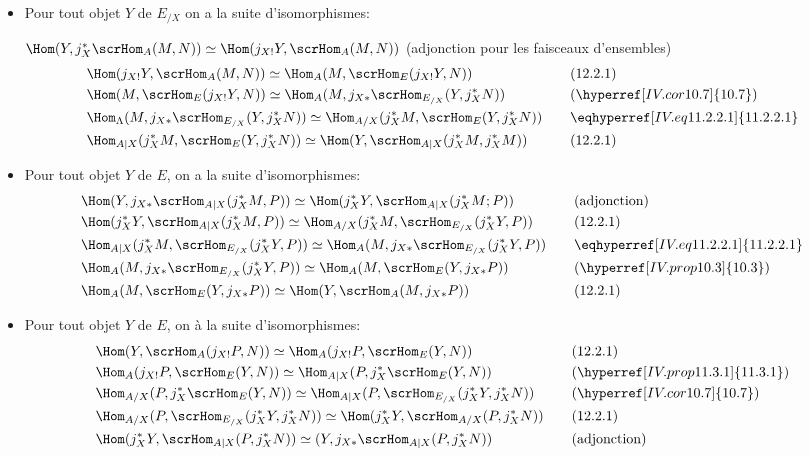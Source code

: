 \begin{itemize}
\item[Démontrons d).] Pour tout objet $Y$ de $E_{/X}$ on a la suite
d'isomorphismes:

$\Hom(Y,j^{\ast}_X\scrHom_A(M,N))\simeq \Hom(j_{X!}Y,\scrHom_A
(M,N))$ (adjonction pour les faisceaux d'ensembles)
\begin{alignat*}{2}
& \Hom(j_{X!}Y,\scrHom_A(M,N))\simeq \Hom_A (M,\scrHom_E(j_{X!}Y,
N))
&\quad& (12.2.1)\\
& \Hom(M, \scrHom_E(j_{X!}Y,N))\simeq \Hom_A
(M,j_{X\ast}\scrHom_{E_{/X}}(Y,j^{\ast}_XN)) && (\hyperref[IV.cor10.7]{10.7})\\
& \Hom_{\Lambda}(M, j_{X\ast}\scrHom_{E_{/X}}(Y, j^{\ast}_XN))\simeq
\Hom_{A/X}(j^{\ast}_XM, \scrHom_E (Y,j^{\ast}_XN)) && \eqhyperref[IV.eq11.2.2.1]{11.2.2.1}\\
 & \Hom_{A| X}(j^{\ast}_XM, \scrHom_E (Y, j^{\ast}_XN))\simeq
\Hom(Y,\scrHom_{A| X}(j^{\ast}_X M, j^{\ast}_XM)) && (12.2.1)
\end{alignat*}\pageoriginale

\item[Démontrons c).] Pour tout objet $Y$ de $E$, on a la suite
d'isomorphismes:
\begin{alignat*}{2}
& \Hom(Y,j_{X\ast}\scrHom_{A| X}(j^{\ast}_XM,P))\simeq
\Hom(j^{\ast}_XY, \scrHom_{A| X}(j^{\ast}_XM; P)) &\quad&
\text{(adjonction)}\\
&\Hom (j^{\ast}_XY, \scrHom_{A| X}(j^{\ast}_XM, P))\simeq
\Hom_{A/X}(j^{\ast}_XM, \scrHom_{E_{/X}}(j^{\ast}_XY,P)) && (12.2.1)\\
&\Hom_{A| X}(j^{\ast}_XM, \scrHom_{E_{/X}}(j^{\ast}_XY,P))\simeq
\Hom_A(M, j_{X\ast}\scrHom_{E_{/X}}(j^{\ast}_XY,P)) && \eqhyperref[IV.eq11.2.2.1]{11.2.2.1}\\
&\Hom_A(M,j_{X\ast}\scrHom_{E_{/X}}(j^{\ast}_XY,P))\simeq
\Hom_A(M,\scrHom_E(Y, j_{X\ast}P)) && (\hyperref[IV.prop10.3]{10.3})\\
&\Hom_A(M,\scrHom_E(Y, j_{X\ast}P))\simeq \Hom(Y,
\scrHom_A(M,j_{X\ast}P)) && (12.2.1)
\end{alignat*}

\item[Démontrons d).] Pour tout objet $Y$ de $E$, on à la suite
d'isomorphismes:
\begin{alignat*}{2}
& \Hom(Y,\scrHom_A(j_{X!}P,N))\simeq \Hom_A(j_{X!}P,\scrHom_E(Y,N))
&\quad& (12.2.1)\\
&\Hom_A(j_{X!}P,\scrHom_E(Y,N))\simeq \Hom_{A|
X}(P,j^{\ast}_X\scrHom_E(Y,N)) && (\hyperref[IV.prop11.3.1]{11.3.1})\\
&\Hom_{A/X}(P,j^{\ast}_X\scrHom_E(Y,N))\simeq \Hom_{A|
X}(P,\scrHom_{E_{/X}}(j^{\ast}_XY, j^{\ast}_XN)) && (\hyperref[IV.cor10.7]{10.7})\\
&\Hom_{A/X}(P,\scrHom_{E_{/X}}(j^{\ast}_XY, j^{\ast}_XN))\simeq
\Hom(j^{\ast}_XY, \scrHom_{A/X}(P,j^{\ast}_XN)) && (12.2.1)\\
&\Hom(j^{\ast}_XY, \scrHom_{A| X}(P,j^{\ast}_XN))\simeq (Y,
j_{X\ast}\scrHom_{A| X}(P, j^{\ast}_XN)) && \text{(adjonction)}
\end{alignat*}
\end{itemize}

